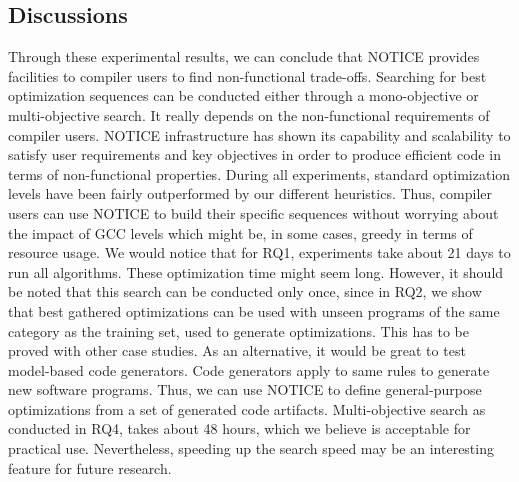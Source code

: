 \noindent{}
\subsection{Discussions}
Through these experimental results, we can conclude that NOTICE provides facilities to compiler users to find non-functional trade-offs. Searching for best optimization sequences can be conducted either through a mono-objective or multi-objective search. It really depends on the non-functional requirements of compiler users. NOTICE infrastructure has shown its capability and scalability to satisfy user requirements and key objectives in order to produce efficient code in terms of non-functional properties. During all experiments, standard optimization levels have been fairly outperformed by our different heuristics. Thus, compiler users can use NOTICE to build their specific sequences without worrying about the impact of GCC levels which might be, in some cases, greedy in terms of resource usage.
We would notice that for RQ1, experiments take about 21 days to run all algorithms. These optimization time might seem long. However, it should be noted that this search can be conducted only once, since in RQ2, we show that best gathered optimizations can be used with unseen programs of the same category as the training set, used to generate optimizations. This has to be proved with other case studies. As an alternative, it would be great to test model-based code generators. Code generators apply to same rules to generate new software programs. Thus, we can use NOTICE to define general-purpose optimizations from a set of generated code artifacts. 
Multi-objective search as conducted in RQ4, takes about 48 hours, which we believe is acceptable for practical use. Nevertheless, speeding up the search speed may be an interesting feature for future research.




